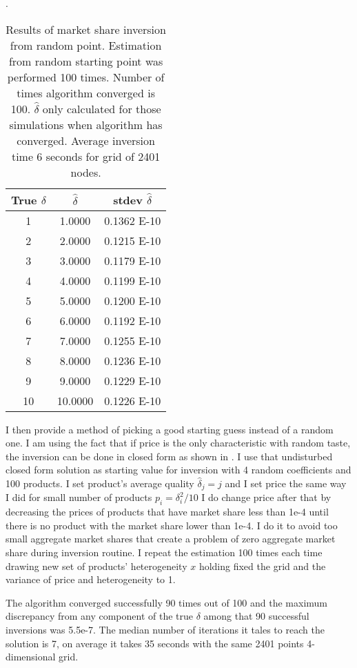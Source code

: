 \documentclass[12pt,letterpaper]{article}
\begin{document}
	\begin{table}
	\caption{Results of market share inversion from random point. Estimation from random starting point was performed 100 times. Number of times algorithm converged is 100. $\hat{\delta}$ only calculated for those simulations when algorithm has converged. Average inversion time 6 seconds for grid of 2401 nodes. } \label{tab:est-small1}. 
	\centering
	\begin{tabular}{c|c|c}
		True $\delta$ & $\hat\delta$ & stdev $\hat\delta$ \\
		\hline
		1	& 1.0000	&0.1362 E-10 \\
		2	& 2.0000	&0.1215 E-10 \\
		3	& 3.0000	&0.1179 E-10 \\
		4	& 4.0000	&0.1199 E-10 \\
		5	& 5.0000	&0.1200 E-10 \\
		6	& 6.0000	&0.1192 E-10 \\
		7	& 7.0000	&0.1255 E-10 \\
		8	& 8.0000	&0.1236 E-10 \\
		9	& 9.0000	&0.1229 E-10 \\
		10	& 10.0000	&0.1226 E-10 \\
	\end{tabular}
	\end{table}
	

	I then provide a method of picking a good starting guess instead of a random one.  I am using the fact that if price is the only characteristic with random taste, the inversion can be done in closed form as shown in \cite{song2007measuring}. I use that undisturbed closed form solution as starting value for inversion with 4 random coefficients and 100 products. I set product's average quality $\hat \delta_j = j$ and I set price the same way I did for small number of products $p_i = \delta_i^2/10$ I do change price after that by decreasing the prices of products that have market share less than 1e-4 until there is no product with the market share lower than 1e-4. I do it to avoid too small aggregate market shares that create a problem of zero aggregate market share during inversion routine. I repeat the estimation 100 times each time drawing new set of products' heterogeneity $x$ holding fixed the grid and the variance of price and heterogeneity to 1.
	
	The algorithm converged successfully 90 times out of 100 and the maximum discrepancy from any component of the true $\delta$ among that 90 successful inversions was 5.5e-7. The median number of iterations it tales to reach the solution is 7, on average it takes 35 seconds with the same 2401 points 4-dimensional grid.
	
\end{document}
